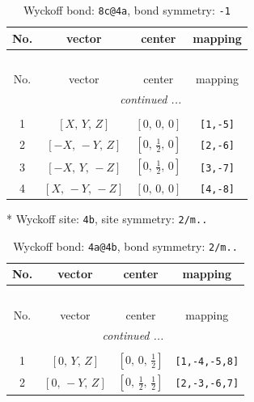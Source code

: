 \documentclass[fleqn,8pt]{jsarticle}
\begin{document}
\renewcommand{\arraystretch}{1.2}
\begin{longtable}{cccc}
\caption{Wyckoff bond: {\tt 8c@4a}, bond symmetry: {\tt -1}}
 \\
 \hline \hline
No. & vector & center & mapping \\ \hline \endfirsthead

\multicolumn{3}{l}{\tablename\ \thetable{}} \\
 \hline \hline
No. & vector & center & mapping \\ \hline \endhead

 \hline \hline
\multicolumn{3}{r}{\footnotesize\it continued ...} \\ \endfoot

 \hline \hline
\multicolumn{3}{r}{} \\ \endlastfoot

1 & $\left[ X,\, Y,\, Z \right]$ & $\left[ 0,\, 0,\, 0 \right]$ & {\tt [1,-5]} \\ \hline
2 & $\left[ - X,\, - Y,\, Z \right]$ & $\left[ 0,\, \frac{1}{2},\, 0 \right]$ & {\tt [2,-6]} \\ \hline
3 & $\left[ - X,\, Y,\, - Z \right]$ & $\left[ 0,\, \frac{1}{2},\, 0 \right]$ & {\tt [3,-7]} \\ \hline
4 & $\left[ X,\, - Y,\, - Z \right]$ & $\left[ 0,\, 0,\, 0 \right]$ & {\tt [4,-8]} \\
\end{longtable}
* Wyckoff site: {\tt 4b}, site symmetry: {\tt 2/m..}
\renewcommand{\arraystretch}{1.2}
\begin{longtable}{cccc}
\caption{Wyckoff bond: {\tt 4a@4b}, bond symmetry: {\tt 2/m..}}
 \\
 \hline \hline
No. & vector & center & mapping \\ \hline \endfirsthead

\multicolumn{3}{l}{\tablename\ \thetable{}} \\
 \hline \hline
No. & vector & center & mapping \\ \hline \endhead

 \hline \hline
\multicolumn{3}{r}{\footnotesize\it continued ...} \\ \endfoot

 \hline \hline
\multicolumn{3}{r}{} \\ \endlastfoot

1 & $\left[ 0,\, Y,\, Z \right]$ & $\left[ 0,\, 0,\, \frac{1}{2} \right]$ & {\tt [1,-4,-5,8]} \\ \hline
2 & $\left[ 0,\, - Y,\, Z \right]$ & $\left[ 0,\, \frac{1}{2},\, \frac{1}{2} \right]$ & {\tt [2,-3,-6,7]} \\
\end{longtable}
\end{document}
